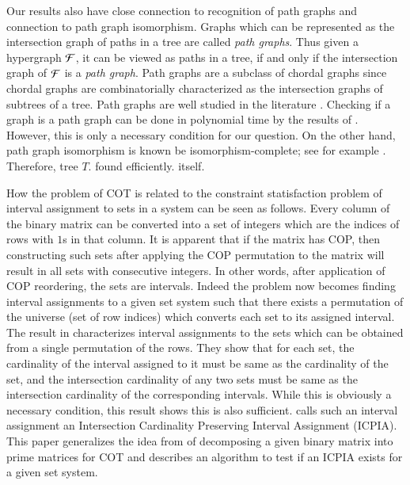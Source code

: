 \documentclass[MS,]{iitmdiss}
\begin{document}
Our results also have close connection to recognition of path graphs
and connection to path graph isomorphism.  Graphs which can be
represented as the intersection graph of paths in a tree are called
{\em path graphs}\cite{mcg04}. Thus given a hypergraph ${\cal F}$, it can
be viewed as paths in a tree, if and only if the intersection graph of
${\cal F}$ is a {\em path graph}. Path graphs are a subclass of chordal
graphs since chordal graphs are combinatorially characterized as the
intersection graphs of subtrees of a tree.  Path graphs are well
studied in the literature \cite{plr70,gav78,bp93,mcg04}.  Checking if
a graph is a path graph can be done in polynomial time by the results
of \cite{gav78,aas93}.  However, this is only a necessary condition
for our question.    On the other hand, path graph isomorphism is known
be isomorphism-complete; see for example \cite{kklv10}. Therefore,
 tree $T$.
 found efficiently.   itself.



How the problem of COT is related to the constraint statisfaction
problem of interval assignment to sets in a system can be seen as
follows. Every column of the binary matrix can be converted into a set
of integers which are the indices of rows with $1$s in that column. It
is apparent that if the matrix has COP, then constructing such sets
after applying the COP permutation to the matrix will result in all
sets with consecutive integers. In other words, after application of
COP reordering, the sets are intervals. Indeed the problem now becomes
finding interval assignments to a given set system such that there
exists a permutation of the universe (set of row indices) which
converts each set to its assigned interval. The result in
\cite{nsnrs09} characterizes interval assignments to the sets which
can be obtained from a single permutation of the rows.  They show that
for each set, the cardinality of the interval assigned to it must be
same as the cardinality of the set, and the intersection cardinality
of any two sets must be same as the intersection cardinality of the
corresponding intervals.  While this is obviously a necessary
condition, this result shows this is also sufficient.  \cite{nsnrs09}
calls such an interval assignment an Intersection Cardinality
Preserving Interval Assignment (ICPIA).  This paper generalizes the
idea from \cite{wlh02} of decomposing a given binary matrix into prime
matrices for COT and describes an algorithm to test if an ICPIA exists
for a given set system.
\end{document}
